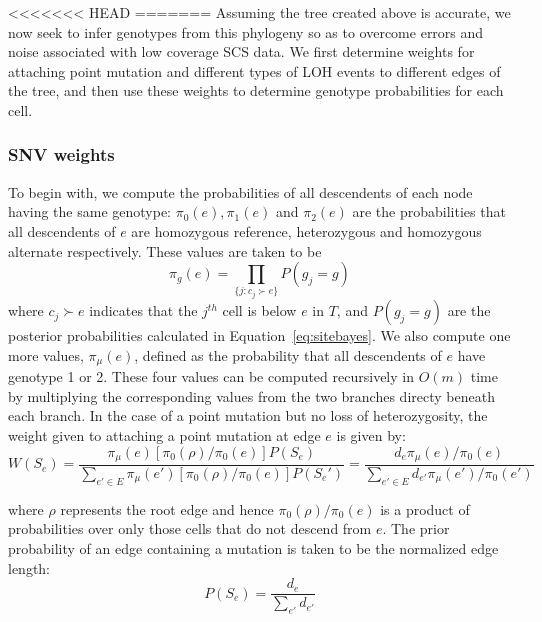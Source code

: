 \documentclass[../../main.tex]{subfiles}
\begin{document}
<<<<<<< HEAD
=======
Assuming the tree created above is accurate, we now seek to infer genotypes from this phylogeny so as to overcome errors and noise associated with low coverage SCS data. We first determine weights for attaching point mutation and different types of LOH events to different edges of the tree, and then use these weights to determine genotype probabilities for each cell.
\subsubsection{SNV weights}
To begin with, we compute the probabilities of all descendents of each node having the same genotype: $\pi_0(e), \pi_1(e)$ and $\pi_2(e)$ are the probabilities that all descendents of $e$ are homozygous reference, heterozygous and homozygous alternate respectively. These values are taken to be
\begin{equation*}
\pi_g(e) = \prod_{\{j:c_j\succ e\}} P(g_j = g)
\end{equation*}
where $c_j\succ e$ indicates that the $j^{th}$ cell is below $e$ in $T$, and $P(g_j =g)$ are the posterior probabilities calculated in Equation~\eqref{eq:sitebayes}. We also compute one more values, $\pi_\mu(e)$, defined as the probability that all descendents of $e$ have genotype 1 or 2. These four values can be computed recursively in $O(m)$ time by multiplying the corresponding values from the two branches directy beneath each branch. In the case of a point mutation but no loss of heterozygosity, the weight given to attaching a point mutation at edge $e$ is given by:
\begin{equation} \label{eq:edgemutpost}
W(S_e) = \frac{\pi_\mu(e)\left[\pi_0(\rho)/\pi_0(e)\right]P(S_e)}{\sum_{e'\in E}\pi_\mu(e')\left[\pi_0(\rho)/\pi_0(e)\right]P(S_e')} = \frac{d_e\pi_\mu(e)/\pi_0(e)}{\sum_{e'\in E} d_{e'}\pi_\mu(e')/\pi_0(e')}
\end{equation}

where $\rho$ represents the root edge and hence $\pi_0(\rho)/\pi_0(e)$ is a product of probabilities over only those cells that do not descend from $e$. The prior probability of an edge containing a mutation is taken to be the normalized edge length:
\begin{equation*}
P(S_e) = \frac{d_e}{\sum_{e'} d_{e'}}
\end{equation*}
\end{document}
